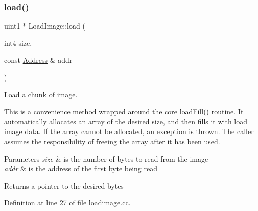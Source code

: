 \subsubsection{\texorpdfstring{load()}{load()}}
{\footnotesize\ttfamily uint1 $\ast$ Load\+Image\+::load (\begin{DoxyParamCaption}\item[{int4}]{size,  }\item[{const \mbox{\hyperlink{class_address}{Address}} \&}]{addr }\end{DoxyParamCaption})}



Load a chunk of image. 

This is a convenience method wrapped around the core \mbox{\hyperlink{class_load_image_af00d3957284bf0b4721be0ada5ef4328}{load\+Fill()}} routine. It automatically allocates an array of the desired size, and then fills it with load image data. If the array cannot be allocated, an exception is thrown. The caller assumes the responsibility of freeing the array after it has been used. 
\begin{DoxyParams}{Parameters}
{\em size} & is the number of bytes to read from the image \\
\hline
{\em addr} & is the address of the first byte being read \\
\hline
\end{DoxyParams}
\begin{DoxyReturn}{Returns}
a pointer to the desired bytes 
\end{DoxyReturn}


Definition at line 27 of file loadimage.\+cc.

